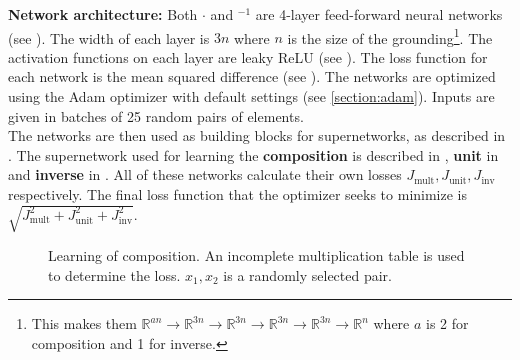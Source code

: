 \textbf{Network architecture:} Both $\cdot$ and $^{-1}$ are 4-layer feed-forward neural networks (see ). The width of each layer is $3n$ where $n$ is the size of the grounding\footnote{This makes them $\mathbb{R}^{an}\rightarrow\mathbb{R}^{3n}\rightarrow\mathbb{R}^{3n}\rightarrow\mathbb{R}^{3n}\rightarrow\mathbb{R}^{3n}\rightarrow\mathbb{R}^{n}$ where $a$ is 2 for composition and 1 for inverse.}. The activation functions on each layer are leaky ReLU (see ). The loss function for each network is the mean squared difference (see ). The networks are optimized using the Adam optimizer with default settings (see \autoref{section:adam}). Inputs are given in batches of 25 random pairs of elements. \\

The networks are then used as building blocks for supernetworks, as described in . The supernetwork used for learning the \textbf{composition} is described in , \textbf{unit} in  and \textbf{inverse} in . All of these networks calculate their own losses $J_{\text{mult}},J_{\text{unit}},J_{\text{inv}}$ respectively. The final loss function that the optimizer seeks to minimize is $\sqrt{J_{\text{mult}}^2+J_{\text{unit}}^2+J_{\text{inv}}^2}$.

\begin{figure}
	\caption{Learning of composition. An incomplete multiplication table is used to determine the loss. $x_1,x_2$ is a randomly selected pair.}
	\label{learning_comp}
	\center
{}
\end{figure}

